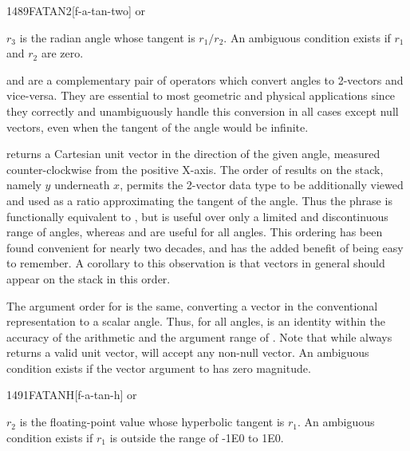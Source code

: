 \begin{newword}{1489}{FATAN2}[f-a-tan-two]
	 or

	$r_3$ is the radian angle whose tangent is $r_1/r_2$.
	An ambiguous condition exists if $r_1$ and $r_2$ are zero.

	\begin{rationale} %
		 and  are a complementary pair of
		operators which convert angles to 2-vectors and vice-versa.
		They are essential to most geometric and physical applications
		since they correctly and unambiguously handle this conversion
		in all cases except null vectors, even when the tangent of the
		angle would be infinite.

		 returns a Cartesian unit vector in the direction
		of the given angle, measured counter-clockwise from the positive
		X-axis. The order of results on the stack, namely $y$ underneath
		$x$, permits the 2-vector data type to be additionally viewed
		and used as a ratio approximating the tangent of the angle. Thus
		the phrase   is functionally equivalent
		to , but is useful over only a limited and
		discontinuous range of angles, whereas  and
		 are useful for all angles. This ordering has been
		found convenient for nearly two decades, and has the added
		benefit of being easy to remember. A corollary to this
		observation is that vectors in general should appear on the
		stack in this order.

		The argument order for  is the same, converting a
		vector in the conventional representation to a scalar angle.
		Thus, for all angles,   is an identity
		within the accuracy of the arithmetic and the argument range of
		. Note that while  always returns a
		valid unit vector,  will accept any non-null vector.
		An ambiguous condition exists if the vector argument to
		 has zero magnitude.
	\end{rationale}
\end{newword}


\begin{newword}{1491}{FATANH}[f-a-tan-h]
	 or

	$r_2$ is the floating-point value whose hyperbolic tangent is
	$r_1$. An ambiguous condition exists if $r_1$ is outside the
	range of -1E0 to 1E0.
\end{newword}



